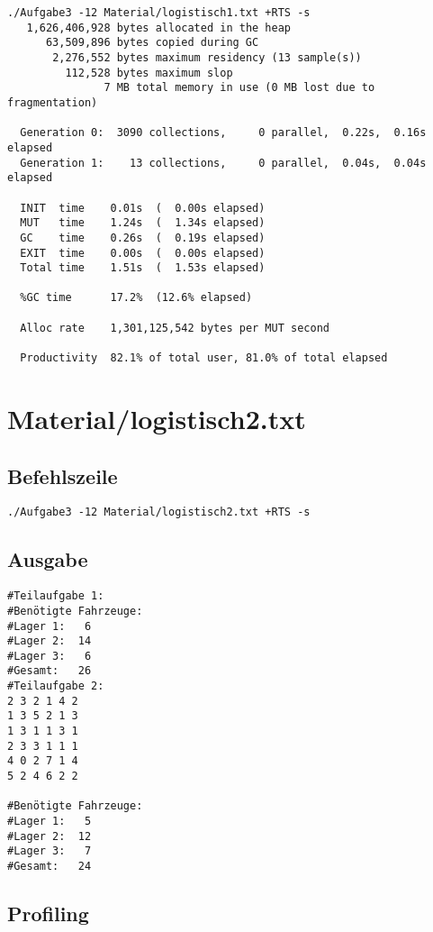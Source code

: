 \documentclass{scrreprt}
\begin{document}
\begin{verbatim}
./Aufgabe3 -12 Material/logistisch1.txt +RTS -s 
   1,626,406,928 bytes allocated in the heap
      63,509,896 bytes copied during GC
       2,276,552 bytes maximum residency (13 sample(s))
         112,528 bytes maximum slop
               7 MB total memory in use (0 MB lost due to fragmentation)

  Generation 0:  3090 collections,     0 parallel,  0.22s,  0.16s elapsed
  Generation 1:    13 collections,     0 parallel,  0.04s,  0.04s elapsed

  INIT  time    0.01s  (  0.00s elapsed)
  MUT   time    1.24s  (  1.34s elapsed)
  GC    time    0.26s  (  0.19s elapsed)
  EXIT  time    0.00s  (  0.00s elapsed)
  Total time    1.51s  (  1.53s elapsed)

  %GC time      17.2%  (12.6% elapsed)

  Alloc rate    1,301,125,542 bytes per MUT second

  Productivity  82.1% of total user, 81.0% of total elapsed
\end{verbatim}

\section{Material/logistisch2.txt}

\subsection*{Befehlszeile}

\begin{verbatim}
./Aufgabe3 -12 Material/logistisch2.txt +RTS -s
\end{verbatim}

\subsection*{Ausgabe}

\begin{verbatim}
#Teilaufgabe 1:
#Benötigte Fahrzeuge:
#Lager 1:   6
#Lager 2:  14
#Lager 3:   6
#Gesamt:   26
#Teilaufgabe 2:
2 3 2 1 4 2
1 3 5 2 1 3
1 3 1 1 3 1
2 3 3 1 1 1
4 0 2 7 1 4
5 2 4 6 2 2

#Benötigte Fahrzeuge:
#Lager 1:   5
#Lager 2:  12
#Lager 3:   7
#Gesamt:   24
\end{verbatim}

\subsection*{Profiling}
\end{document}
